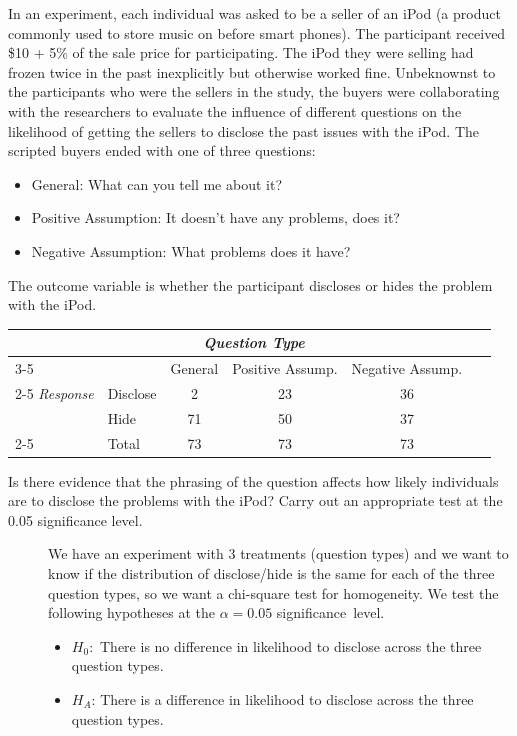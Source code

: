 \begin{examplewrap}
\begin{nexample}{
 In an experiment, each individual was asked to be a seller of an iPod
  (a product commonly used to store music on before smart phones).
  The participant received \$10 + 5\% of the sale price for participating.
  The iPod they were selling had frozen twice in the past inexplicitly but
  otherwise worked fine. Unbeknownst to the participants who were the sellers
in the study,
the buyers were collaborating with the researchers
to evaluate the influence of different questions
on the likelihood of getting the sellers to disclose
the past issues with the iPod.
The scripted buyers ended with one of three questions:
 \begin{itemize}\vspace{-2mm}
\setlength{\itemsep}{0mm}
    \item{General: What can you tell me about it?}
    \item{Positive Assumption: It doesn't have any problems, does it?}
    \item{Negative Assumption: What problems does it have?}
  \end{itemize}
The outcome variable is whether the participant discloses or hides the problem with the iPod.
\begin{center}
\begin{tabular}{l l c c c l}
								&			& \multicolumn{2}{c}{\textit{Question Type}}	& &\hspace{10mm}\ 		\\
\cline{3-5}
								&			& General		& Positive Assump.		& Negative Assump.	\\
\cline{2-5}
\textit{Response}								& Disclose		& 2		& 23		& 36	\\
					& Hide		& 71			& 50 			& 37	\\
\cline{2-5}
								& Total		& 73		& 73		& 73
\end{tabular}
\end{center}
 Is there evidence that the phrasing of the question affects how likely individuals are to disclose the problems with the iPod?  Carry out an appropriate test at the 0.05 significance level.  }
\vspace{-1mm}
\begin{description}
\item[] We have an experiment with 3 treatments (question types) and we want to know if the distribution of disclose/hide is the same for each of the three question types, so we want a chi-square test for homogeneity.  We test the following hypotheses at the $\alpha=0.05$ \mbox{significance level.}
\begin{itemize}
\setlength{\itemsep}{0mm}
\item[] $H_0$: \,There is no difference in likelihood to disclose across the three question types.  
\item[] $H_A$: There is a difference in likelihood to disclose across the three question types.  
\end{itemize}


\end{description}
\end{nexample}
\end{examplewrap}
